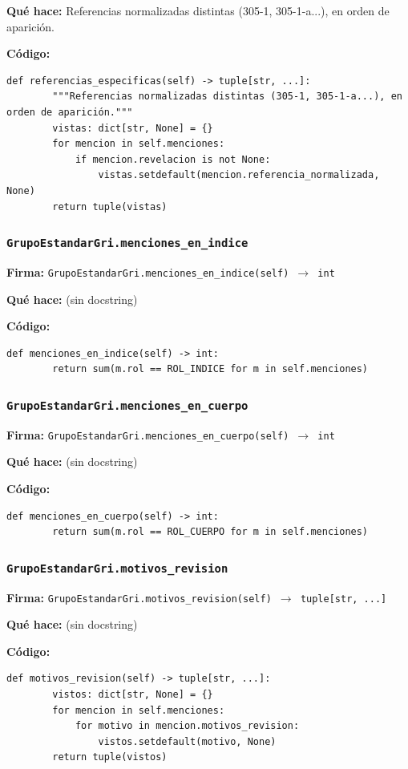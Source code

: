 \documentclass[11pt,a4paper]{article}
\begin{document}
\textbf{Qué hace:} Referencias normalizadas distintas (305-1, 305-1-a...), en orden de aparición.

\textbf{Código:}
\begin{lstlisting}
def referencias_especificas(self) -> tuple[str, ...]:
        """Referencias normalizadas distintas (305-1, 305-1-a...), en orden de aparición."""
        vistas: dict[str, None] = {}
        for mencion in self.menciones:
            if mencion.revelacion is not None:
                vistas.setdefault(mencion.referencia_normalizada, None)
        return tuple(vistas)
\end{lstlisting}

\subsubsection*{\texttt{GrupoEstandarGri.menciones\_en\_indice}}
\textbf{Firma:} \texttt{GrupoEstandarGri.menciones\_en\_indice(self) $\rightarrow$ int}

\textbf{Qué hace:} (sin docstring)

\textbf{Código:}
\begin{lstlisting}
def menciones_en_indice(self) -> int:
        return sum(m.rol == ROL_INDICE for m in self.menciones)
\end{lstlisting}

\subsubsection*{\texttt{GrupoEstandarGri.menciones\_en\_cuerpo}}
\textbf{Firma:} \texttt{GrupoEstandarGri.menciones\_en\_cuerpo(self) $\rightarrow$ int}

\textbf{Qué hace:} (sin docstring)

\textbf{Código:}
\begin{lstlisting}
def menciones_en_cuerpo(self) -> int:
        return sum(m.rol == ROL_CUERPO for m in self.menciones)
\end{lstlisting}

\subsubsection*{\texttt{GrupoEstandarGri.motivos\_revision}}
\textbf{Firma:} \texttt{GrupoEstandarGri.motivos\_revision(self) $\rightarrow$ tuple[str, ...]}

\textbf{Qué hace:} (sin docstring)

\textbf{Código:}
\begin{lstlisting}
def motivos_revision(self) -> tuple[str, ...]:
        vistos: dict[str, None] = {}
        for mencion in self.menciones:
            for motivo in mencion.motivos_revision:
                vistos.setdefault(motivo, None)
        return tuple(vistos)
\end{lstlisting}
\end{document}
